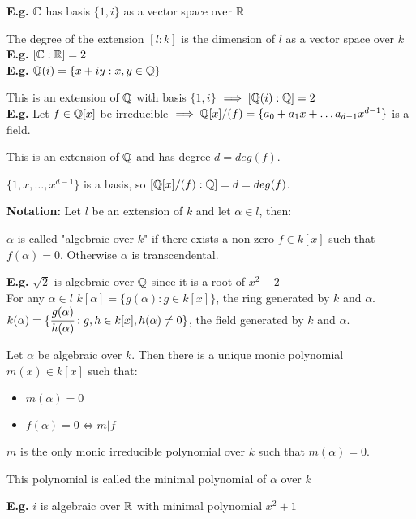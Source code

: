 \documentclass[11pt]{article}
\begin{document}
$ $\\
\textbf{E.g.} $\mathbb{C}$ has basis $\{1,i\}$ as a vector space over $\mathbb{R}$

The degree of the extension $[l:k]$ is the dimension of $l$ as a vector space over $k$ \\
\textbf{E.g.} $[\mathbb{C} : \mathbb{R}] = 2$ \\
\textbf{E.g.} $\mathbb{Q}(i) = \{x+iy : x,y \in \mathbb{Q} \}$

This is an extension of $\mathbb{Q}$ with basis $\{1,i\} $ $\implies [\mathbb{Q}(i) : \mathbb{Q}] = 2$
$ $\\[0.5em]
\textbf{E.g.} Let $f \in \mathbb{Q}[x] $ be irreducible $\implies \mathbb{Q}[x] /(f) = \{a_0 + a_1x + \dots a_{d-1}x^{d-1} \} $ is a field.

This is an extension of $\mathbb{Q}$ and has degree $d=deg(f)$.

$\{ 1,x,\dots, x^{d-1} \}$ is a basis, so $[\mathbb{Q}[x]/(f) :\mathbb{Q}] = d = deg(f)$.

$ $\\
\textbf{Notation: } Let $l$ be an extension of $k$ and let $\alpha \in l$, then:

\begin{defn}
	$\alpha$ is called "algebraic over $k$" if there exists a non-zero $f \in k[x] $ such that $f(\alpha) = 0$.
	Otherwise $\alpha$ is transcendental.
\end{defn}
$ $\\[-0.5em]
\textbf{E.g.} $\sqrt{2} $ is algebraic over $\mathbb{Q}$ since it is a root of $x^2 - 2$
$ $\\[1em]
For any $\alpha \in l$ $k[\alpha] = \{ g(\alpha) : g \in k[x]\}$, the ring generated by $k$ and $\alpha$.
$ $\\
$k(\alpha) = \{ \cfrac{g(\alpha)}{h(\alpha)} : g,h \in k[x], h(\alpha) \neq 0\}$, the field generated by $k$ and $\alpha$.


\begin{prop}
	Let $\alpha$ be algebraic over $k$.
	Then there is a unique monic polynomial $m(x) \in k[x]$ such that:
	\begin{itemize}
		\item{$m(\alpha) = 0 $}
		\item{$f(\alpha) = 0 \iff m | f$}
	\end{itemize}
\end{prop}

$m$ is the only monic irreducible polynomial over $k$ such that $m(\alpha) = 0$.


\begin{defn}
This polynomial is called the minimal polynomial of $\alpha$ over $k$
\end{defn}
$ $\\[-0.5em]
\textbf{E.g.} $i$ is algebraic over $\mathbb{R}$ with minimal polynomial $x^2 + 1$
\end{document}

